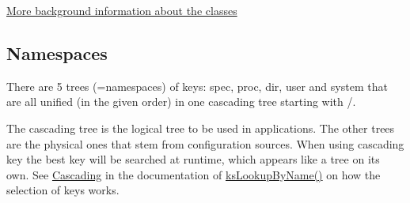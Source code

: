 \hyperlink{md_doc_help_elektra-classes_doc_help_elektra-classes_md}{More background information about the classes}

\subsection*{Namespaces}

There are 5 trees (=namespaces) of keys\+: {\ttfamily spec}, {\ttfamily proc}, {\ttfamily dir}, {\ttfamily user} and {\ttfamily system} that are all unified (in the given order) in one cascading tree starting with {\ttfamily /}.

The cascading tree is the logical tree to be used in applications. The other trees are the physical ones that stem from configuration sources. When using cascading key the best key will be searched at runtime, which appears like a tree on its own. See \hyperlink{group__keyset_cascading}{Cascading} in the documentation of \hyperlink{group__keyset_gad2e30fb6d4739d917c5abb2ac2f9c1a1}{ks\+Lookup\+By\+Name()} on how the selection of keys works.


